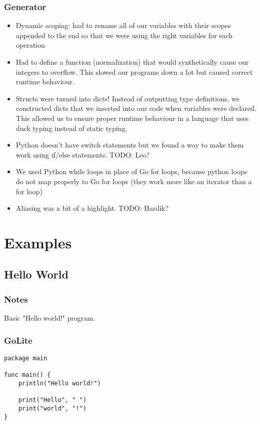 \documentclass{article}
\begin{document}
\subsubsection{Generator}
\begin{itemize}
\item Dynamic scoping: had to rename all of our variables with their scopes appended to the end so that we were using the right variables for each operation
\item Had to define a function (normalization) that would synthetically cause our integers to overflow. This slowed our programs down a lot but caused correct runtime behaviour.
\item Structs were turned into dicts! Instead of outputting type definitions, we constructed dicts that we inserted into our code when variables were declared. This allowed us to ensure proper runtime behaviour in a language that uses duck typing instead of static typing.
\item Python doesn't have switch statements but we found a way to make them work using if/else statements. TODO: Leo?
\item We used Python while loops in place of Go for loops, because python loops do not map properly to Go for loops (they work more like an iterator than a for loop)
\item Aliasing was a bit of a highlight. TODO: Hardik?
\end{itemize}

\section{Examples}

\subsection{Hello World}
\subsubsection{Notes}
Basic "Hello world!" program.

\subsubsection{GoLite}
\begin{lstlisting}
package main

func main() {
    println("Hello world!")

    print("Hello", " ")
    print("world", "!")
}
\end{lstlisting}
\end{document}
